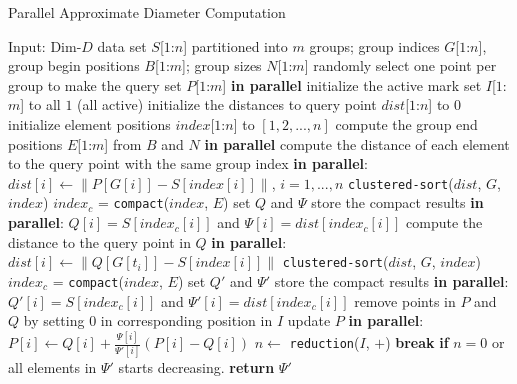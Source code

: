 \begin{algorithm}[htb]
    \caption{Parallel Approximate Diameter Computation}
    \label{algo:6:diameter-parallel}
    \begin{algorithmic}[1]
    \STATE Input: Dim-$D$ data set $S$[$1$:$n$] partitioned into $m$ groups; group indices $G$[$1$:$n$], group begin positions $B$[$1$:$m$]; group sizes $N$[$1$:$m$]
    \STATE randomly select one point per group to make the query set $P$[$1$:$m$] {\bf{in parallel}}
    \STATE initialize the active mark set $I$[$1$:$m$] to all $1$ (all active)
    \STATE initialize the distances to query point $dist$[$1$:$n$] to $0$
    \STATE initialize element positions $index$[$1$:$n$] to $[1,2,...,n]$
    \STATE compute the group end positions $E$[$1$:$m$] from $B$ and $N$ {\bf{in parallel}}
    \LOOP
        \STATE compute the distance of each element to the query point with the same group index {\bf{in parallel}}: $dist[i] \leftarrow \|P[G[i]] - S[index[i]]\|$, $i = 1,...,n$
        \STATE \texttt{clustered-sort}($dist$, $G$, $index$)
        \STATE $index_c$ = \texttt{compact}($index$, $E$)
        \STATE set $Q$ and $\Psi$ store the compact results {\bf{in parallel}}: $Q[i] = S[index_c[i]]$ and $\Psi[i] = dist[index_c[i]]$
        \STATE compute the distance to the query point in $Q$ {\bf{in parallel}}: $dist[i] \leftarrow \|Q[G[t_i]] - S[index[i]]\|$
        \STATE \texttt{clustered-sort}($dist$, $G$, $index$)
        \STATE $index_c$ = \texttt{compact}($index$, $E$)
        \STATE set $Q'$ and $\Psi'$ store the compact results {\bf{in parallel}}: $Q'[i] = S[index_c[i]]$ and $\Psi'[i] = dist[index_c[i]]$
        \STATE remove points in $P$ and $Q$ by setting $0$ in corresponding position in $I$
        \STATE update $P$ {\bf{in parallel}}: $P[i] \leftarrow Q[i] + \frac{\Psi[i]}{\Psi'[i]} (P[i] - Q[i])$
        \STATE $n \leftarrow$ \texttt{reduction}($I$, $+$)
        \STATE \textbf{break} \textbf{if} $n = 0$ or all elements in $\Psi'$ starts decreasing.
    \ENDLOOP
    \STATE \textbf{return} $\Psi'$
    \end{algorithmic}
\end{algorithm}

